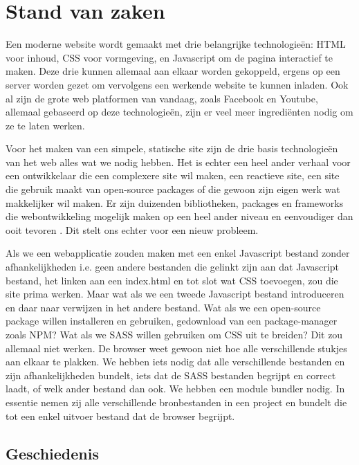 \chapter{Stand van zaken}
\label{ch:stand-van-zaken}

Een moderne website wordt gemaakt met drie belangrijke technologieën: \gls{HTML} voor inhoud, \gls{CSS} voor vormgeving, en \gls{Javascript} om de pagina interactief te maken. Deze drie kunnen allemaal aan elkaar worden gekoppeld, ergens op een server worden gezet om vervolgens een werkende website te kunnen inladen. Ook al zijn de grote web platformen van vandaag, zoals Facebook en Youtube, allemaal gebaseerd op deze technologieën, zijn er veel meer ingrediënten nodig om ze te laten werken.

Voor het maken van een simpele, statische site zijn de drie basis technologieën
 van het web alles wat we nodig hebben. Het is echter een heel ander verhaal voor een ontwikkelaar die een complexere site wil maken, een reactieve site, een site die gebruik maakt van \gls{open-source} \gls{packages} of die gewoon zijn eigen werk wat makkelijker wil maken. Er zijn duizenden bibliotheken, \gls{packages} en frameworks die webontwikkeling mogelijk maken op een heel ander niveau en eenvoudiger dan ooit tevoren \autocite{npm-no-date}. Dit stelt ons echter voor een nieuw probleem. 

Als we een webapplicatie zouden maken met een enkel \gls{Javascript} bestand zonder afhankelijkheden i.e. geen andere bestanden die gelinkt zijn aan dat \gls{Javascript} bestand, het linken aan een index.html en tot slot wat \gls{CSS} toevoegen, zou die site prima werken. Maar wat als we een tweede \gls{Javascript} bestand introduceren en daar naar verwijzen in het andere bestand. Wat als we een \gls{open-source} package willen installeren en gebruiken, gedownload van een \gls{package-manager} zoals NPM? Wat als we \gls{SASS} willen gebruiken om \gls{CSS} uit te breiden? Dit zou allemaal niet werken. De browser weet gewoon niet hoe alle verschillende stukjes aan elkaar te plakken.
We hebben iets nodig dat alle verschillende  bestanden en zijn afhankelijkheden bundelt, iets dat de \gls{SASS} bestanden begrijpt en correct laadt, of welk ander bestand dan ook. We hebben een module bundler nodig. In essentie nemen zij alle verschillende bronbestanden in een project en bundelt die tot een enkel uitvoer bestand dat de browser begrijpt.

\section{Geschiedenis}

